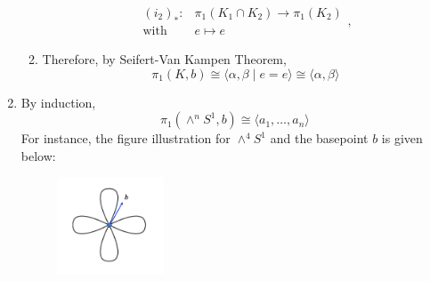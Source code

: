 \begin{example}
\begin{enumerate}
\begin{enumerate}
\[\begin{array}{ll}
(i_2)_*:&\pi_1(K_1\cap K_2)\to\pi_1(K_2)\\
\text{with}&e\mapsto e
\end{array},
\]
\item
Therefore, by Seifert-Van Kampen Theorem,
\[
\pi_1(K,b)\cong\langle\alpha,\beta\mid e=e\rangle
\cong\langle\alpha,\beta\rangle
\]
\end{enumerate}
\item
By induction, 
\[
\pi_1(\wedge^n S^1,b)\cong\langle a_1,\dots,a_n\rangle
\]
For instance, the figure illustration for $\wedge^4 S^1$ and the basepoint $b$ is given below:
\begin{figure}[H]
\centering
\includegraphics[width=0.3\textwidth]{week15/f_39}
\end{figure}


\end{enumerate}
\end{example}
